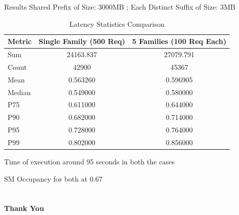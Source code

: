 \documentclass[Serif, 10pt, brown]{beamer}
\theoremstyle{example}
\theoremstyle{plain}
\begin{document}
\begin{frame}{Results}
    Shared Prefix of Size: 3000MB ; Each Distinct Suffix of Size: 3MB
    \begin{table}[ht]
\centering
\begin{tabular}{lcc}
\hline
\textbf{Metric} & \textbf{Single Family (500 Req)} & \textbf{5 Families (100 Req Each)} \\
\hline
Sum     & 24163.837 & 27079.791 \\
Count   & 42900    & 45367    \\
Mean    & 0.563260 & 0.596905 \\
Median  & 0.549000 & 0.580000 \\
P75     & 0.611000 & 0.644000 \\
P90     & 0.682000 & 0.714000 \\
P95     & 0.728000 & 0.764000 \\
P99     & 0.802000 & 0.856000 \\
\hline
\end{tabular}
\caption{Latency Statistics Comparison}
\label{tab:latency_comparison3}
\end{table}

Time of execution around 95 seconds in both the cases

SM Occupancy for both at 0.67
\end{frame}



\section{}
\begin{frame}
    \Huge{\centerline{\bf Thank You}}
\end{frame}
\end{document}
